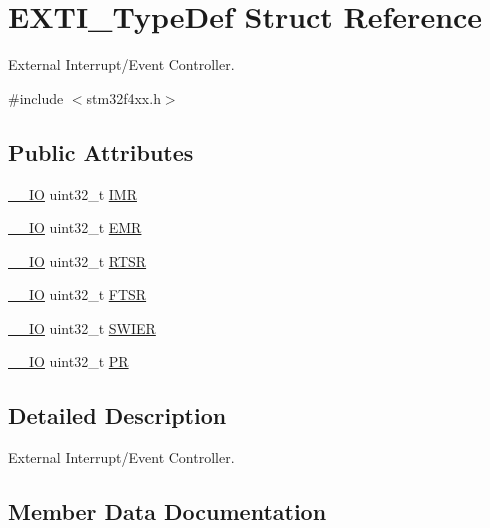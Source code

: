 \hypertarget{struct_e_x_t_i___type_def}{}\section{E\+X\+T\+I\+\_\+\+Type\+Def Struct Reference}
\label{struct_e_x_t_i___type_def}


External Interrupt/\+Event Controller.  




{\ttfamily \#include $<$stm32f4xx.\+h$>$}

\subsection*{Public Attributes}
\begin{DoxyCompactItemize}
\item 
\hyperlink{core__cm4_8h_aec43007d9998a0a0e01faede4133d6be}{\+\_\+\+\_\+\+IO} uint32\+\_\+t \hyperlink{struct_e_x_t_i___type_def_a17d061db586d4a5aa646b68495a8e6a4}{I\+MR}
\item 
\hyperlink{core__cm4_8h_aec43007d9998a0a0e01faede4133d6be}{\+\_\+\+\_\+\+IO} uint32\+\_\+t \hyperlink{struct_e_x_t_i___type_def_a9c5bff67bf9499933959df7eb91a1bd6}{E\+MR}
\item 
\hyperlink{core__cm4_8h_aec43007d9998a0a0e01faede4133d6be}{\+\_\+\+\_\+\+IO} uint32\+\_\+t \hyperlink{struct_e_x_t_i___type_def_ac019d211d8c880b327a1b90a06cc0675}{R\+T\+SR}
\item 
\hyperlink{core__cm4_8h_aec43007d9998a0a0e01faede4133d6be}{\+\_\+\+\_\+\+IO} uint32\+\_\+t \hyperlink{struct_e_x_t_i___type_def_aee667dc148250bbf37fdc66dc4a9874d}{F\+T\+SR}
\item 
\hyperlink{core__cm4_8h_aec43007d9998a0a0e01faede4133d6be}{\+\_\+\+\_\+\+IO} uint32\+\_\+t \hyperlink{struct_e_x_t_i___type_def_a5c1f538e64ee90918cd158b808f5d4de}{S\+W\+I\+ER}
\item 
\hyperlink{core__cm4_8h_aec43007d9998a0a0e01faede4133d6be}{\+\_\+\+\_\+\+IO} uint32\+\_\+t \hyperlink{struct_e_x_t_i___type_def_a133294b87dbe6a01e8d9584338abc39a}{PR}
\end{DoxyCompactItemize}


\subsection{Detailed Description}
External Interrupt/\+Event Controller. 

\subsection{Member Data Documentation}
